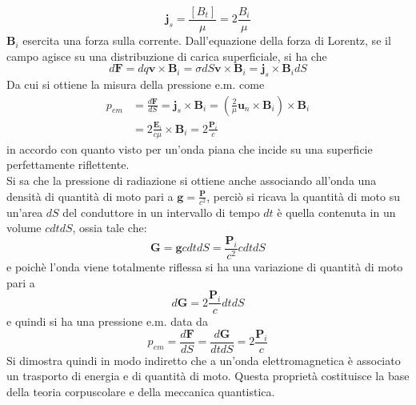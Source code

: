 \documentclass{article}
\begin{document}
\begin{equation}
      \textbf{j}_s=\frac{[B_t]}{\mu}
      =2\frac{B_i}{\mu}
      \nonumber
\end{equation}
$\textbf{B}_i$ esercita una forza sulla corrente.
Dall'equazione della forza di Lorentz, se il campo agisce su una
distribuzione di carica superficiale, si ha che
\begin{equation}
    d\textbf{F}=dq\textbf{v} \times \textbf{B}_i 
    =\sigma dS\textbf{v} \times \textbf{B}_i 
    = \textbf{j}_s \times \textbf{B}_i dS
    \nonumber
\end{equation}
Da cui si ottiene la misura della pressione e.m. come
\begin{equation}
\begin{split}
     p_{em}&=\frac{d\textbf{F}}{dS}
     =\textbf{j}_s \times \textbf{B}_i
     =\left(\frac{2}{\mu}\textbf{u}_n\times \textbf{B}_i\right)\times\textbf{B}_i\\
     &=2\frac{\textbf{E}_i}{c\mu}\times \textbf{B}_i
     =2\frac{\textbf{P}_i}{c}
     \nonumber
\end{split}
\end{equation}
in accordo con quanto visto per un’onda piana che incide su una superficie perfettamente riflettente.\\
Si sa che la pressione di radiazione si ottiene anche associando all’onda una densità di quantità di moto pari a $\textbf{g}=\frac{\textbf{P}}{c^2}$, perciò si ricava la quantità di moto su un’area $dS$ del conduttore in un intervallo di tempo $dt$ è quella contenuta in un volume $cdtdS$, ossia tale che:
\begin{equation}
    \textbf{G}=\textbf{g}cdtdS
    =\frac{\textbf{P}_i}{c^2}cdtdS
    \nonumber
\end{equation}
e poichè l’onda viene totalmente riflessa si ha una
variazione di quantità di moto pari a 
\begin{equation}
    d\textbf{G}=2\frac{\textbf{P}_i}{c}dtdS
    \nonumber
\end{equation}
e quindi si ha una pressione e.m. data da
\begin{equation}
     p_{em}=\frac{d\textbf{F}}{dS}
     =\frac{d\textbf{G}}{dtdS}
     =2\frac{\textbf{P}_i}{c}
     \nonumber
\end{equation}
Si dimostra quindi in modo indiretto che a un’onda elettromagnetica è associato un trasporto di energia e di quantità di moto.
Questa proprietà costituisce la base della teoria corpuscolare e della meccanica quantistica.\\
\end{document}
